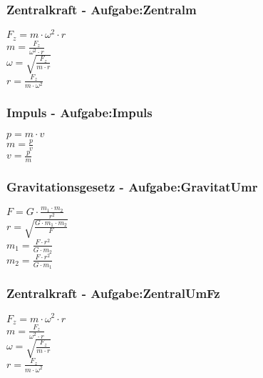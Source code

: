 \subsubsection{Zentralkraft - Aufgabe:Zentralm} 
\begin{minipage}{0.45\textwidth} 
$ F_{z}  = m\cdot \omega ^{2} \cdot r $\\ 
$ m = \frac{ F_{z} }{\omega ^{2} \cdot r} $\\ 
$ \omega  = \sqrt{\frac{ F_{z} }{m\cdot r}} $\\ 
$ r = \frac{ F_{z} }{m\cdot \omega ^{2} } $\\ 
\end{minipage} 
\begin{minipage}{0.45\textwidth} 
 
\end{minipage} 
\subsubsection{Impuls - Aufgabe:Impuls} 
\begin{minipage}{0.45\textwidth} 
$ p = m\cdot v $\\ 
$ m = \frac{p}{v} $\\ 
$ v = \frac{p}{m} $\\ 
\end{minipage} 
\begin{minipage}{0.45\textwidth} 
 
\end{minipage} 
\subsubsection{Gravitationsgesetz - Aufgabe:GravitatUmr} 
\begin{minipage}{0.45\textwidth} 
$ F = G \cdot  \frac{m_{1} \cdot m_{2} }{  r^{2} } $\\ 
$ r = \sqrt{\frac{G\cdot m_{1} \cdot m_{2} }{   F}} $\\ 
$ m_{1}  =  \frac{F\cdot r^{2} }{G\cdot m_{2} } $\\ 
$ m_{2}  =  \frac{F\cdot r^{2} }{G\cdot m_{1} } $\\ 
\end{minipage} 
\begin{minipage}{0.45\textwidth} 
 
\end{minipage} 
\subsubsection{Zentralkraft - Aufgabe:ZentralUmFz} 
\begin{minipage}{0.45\textwidth} 
$ F_{z}  = m\cdot \omega ^{2} \cdot r $\\ 
$ m = \frac{ F_{z} }{\omega ^{2} \cdot r} $\\ 
$ \omega  = \sqrt{\frac{ F_{z} }{m\cdot r}} $\\ 
$ r = \frac{ F_{z} }{m\cdot \omega ^{2} } $\\ 
\end{minipage} 
\begin{minipage}{0.45\textwidth} 
 
\end{minipage} 
